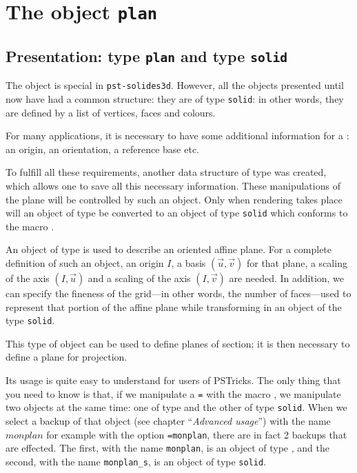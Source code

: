 \section{The object \texttt{plan}}

\subsection{Presentation: type \texttt{plan\/} and type \texttt{solid} }

The  object
 is special in
\texttt{pst-solides3d}. However, all the objects presented until now have had a common structure:
 they are of type \verb+solid+: in other words, they are defined by a list of vertices, faces and colours.

For many applications, it is necessary to have some additional information for a : an origin, an
orientation, a reference base etc.

To fulfill all these requirements, another
data structure of type  was created, which allows one to save all this necessary information. These manipulations of the plane will be controlled
by such an object.
Only when rendering takes place will an object of type  be converted to an object of type \verb+solid+ which conforms to the macro .

An object of type  is used to describe an oriented affine plane.
For a complete definition of such an object,
 an origin
$I$, a basis $(\vec u, \vec v)$ for that plane, a scaling of the axis $(I, \vec u)$ and a scaling of the axis
$(I, \vec v)$ are needed.
In addition, we can specify the fineness of the grid---in other words, the number of faces---used to represent that portion of the affine plane
while transforming in an object of the type \verb+solid+.%

This type of object can be used to define planes of section; it is then necessary to define a plane for projection.%

Its usage is quite easy to understand for users of PSTricks.
The only thing that you need to know is that, if we manipulate a
\texttt{=} with the macro , we manipulate two objects at the same time: one of type  and
the other of type \verb+solid+. When we select a backup
of that object (see chapter ``\textit{Advanced usage}'') with the name $monplan$ for example with the option \texttt{=monplan}, there are
in fact 2 backups that are effected.
The first, with the name \texttt{monplan}, is an object of  type , and the second, with the name \texttt{monplan\_s}, is an object of  type \verb+solid+.


